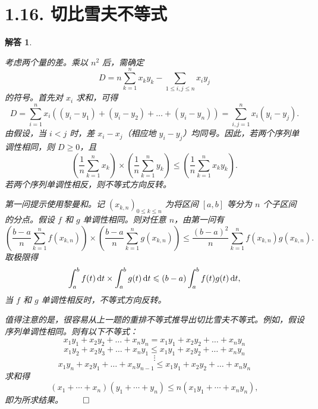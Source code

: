 \documentclass[12pt,UTF8]{ctexbook}
\theoremstyle{exercisestyle}
\theoremstyle{solutionstyle}
\newtheorem*{solution*}{解答}
\newenvironment{solution}
  {\begin{solution*}}
  {\hfill\ensuremath{\qed}\end{solution*}}
\begin{document}
\section{1.16. 切比雪夫不等式}
\begin{solution}
  \begin{subquestions}
    \item 考虑两个量的差。乘以 \(n^2\) 后，需确定
    \[
    D = n \sum_{k=1}^{n} x_k y_k - \sum_{1 \leqslant i,j \leqslant n} x_i y_j
    \]
    的符号。首先对 \(x_i\) 求和，可得
    \[
    D = \sum_{i=1}^{n} x_i \left( (y_i - y_1) + (y_i - y_2) + \dots + (y_i - y_n) \right) = \sum_{i,j=1}^{n} x_i (y_i - y_j).
    \]
    由假设，当 \(i < j\) 时，差 \(x_i - x_j\)（相应地 \(y_i - y_j\)）均同号。因此，若两个序列单调性相同，则 \(D \geqslant 0\)，且
    \[
    \left(\frac{1}{n}\sum_{k=1}^n x_k\right) \times \left(\frac{1}{n}\sum_{k=1}^n y_k\right) \leqslant \left(\frac{1}{n}\sum_{k=1}^n x_k y_k\right).
    \]
    若两个序列单调性相反，则不等式方向反转。
    \item 第一问提示使用黎曼和。记 \((x_{k,n})_{0\leq k\leq n}\) 为将区间 \([a, b]\) 等分为 \(n\) 个子区间的分点。假设 \(f\) 和 \(g\) 单调性相同。则对任意 \(n\)，由第一问有
    \[
    \left(\frac{b-a}{n}\sum_{k=1}^n f(x_{k,n})\right) \times \left(\frac{b-a}{n}\sum_{k=1}^n g(x_{k,n})\right) \leqslant \frac{(b-a)^2}{n}\sum_{k=1}^n f(x_{k,n})g(x_{k,n}).
    \]
    取极限得
    \[
    \int_{a}^{b} f(t) \,\mathrm{d}t \times \int_{a}^{b} g(t) \,\mathrm{d}t \leqslant (b-a)\int_{a}^{b} f(t)g(t) \,\mathrm{d}t,
    \]
    当 \(f\) 和 \(g\) 单调性相反时，不等式方向反转。
  \end{subquestions}
  值得注意的是，很容易从上一题的重排不等式推导出切比雪夫不等式。例如，假设序列单调性相同。则有以下不等式：
  \[
  x_1y_1 + x_2y_2 + \dots + x_ny_n = x_1y_1 + x_2y_2 + \dots + x_ny_n
  \]
  \[
  x_1y_2 + x_2y_3 + \dots + x_ny_1 \leqslant x_1y_1 + x_2y_2 + \dots + x_ny_n
  \]
  \[
  \vdots
  \]
  \[
  x_1y_n + x_2y_1 + \dots + x_ny_{n-1} \leqslant x_1y_1 + x_2y_2 + \dots + x_ny_n
  \]
  求和得
  \[
  (x_1 + \cdots + x_n)(y_1 + \cdots + y_n) \leqslant n(x_1y_1 + \cdots + x_ny_n),
  \]
  即为所求结果。
\end{solution}
\end{document}
